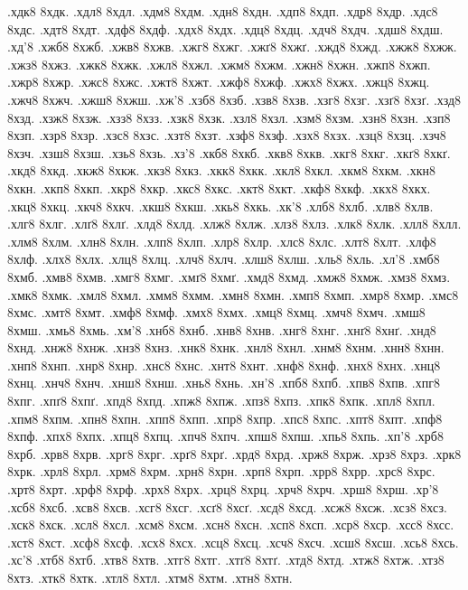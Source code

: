 {.хдк8 8хдк.
.хдл8 8хдл.
.хдм8 8хдм.
.хдн8 8хдн.
.хдп8 8хдп.
.хдр8 8хдр.
.хдс8 8хдс.
.хдт8 8хдт.
.хдф8 8хдф.
.хдх8 8хдх.
.хдц8 8хдц.
.хдч8 8хдч.
.хдш8 8хдш.
.хд'8
.хжб8 8хжб.
.хжв8 8хжв.
.хжг8 8хжг.
.хжґ8 8хжґ.
.хжд8 8хжд.
.хжж8 8хжж.
.хжз8 8хжз.
.хжк8 8хжк.
.хжл8 8хжл.
.хжм8 8хжм.
.хжн8 8хжн.
.хжп8 8хжп.
.хжр8 8хжр.
.хжс8 8хжс.
.хжт8 8хжт.
.хжф8 8хжф.
.хжх8 8хжх.
.хжц8 8хжц.
.хжч8 8хжч.
.хжш8 8хжш.
.хж'8
.хзб8 8хзб.
.хзв8 8хзв.
.хзг8 8хзг.
.хзґ8 8хзґ.
.хзд8 8хзд.
.хзж8 8хзж.
.хзз8 8хзз.
.хзк8 8хзк.
.хзл8 8хзл.
.хзм8 8хзм.
.хзн8 8хзн.
.хзп8 8хзп.
.хзр8 8хзр.
.хзс8 8хзс.
.хзт8 8хзт.
.хзф8 8хзф.
.хзх8 8хзх.
.хзц8 8хзц.
.хзч8 8хзч.
.хзш8 8хзш.
.хзь8 8хзь.
.хз'8
.хкб8 8хкб.
.хкв8 8хкв.
.хкг8 8хкг.
.хкґ8 8хкґ.
.хкд8 8хкд.
.хкж8 8хкж.
.хкз8 8хкз.
.хкк8 8хкк.
.хкл8 8хкл.
.хкм8 8хкм.
.хкн8 8хкн.
.хкп8 8хкп.
.хкр8 8хкр.
.хкс8 8хкс.
.хкт8 8хкт.
.хкф8 8хкф.
.хкх8 8хкх.
.хкц8 8хкц.
.хкч8 8хкч.
.хкш8 8хкш.
.хкь8 8хкь.
.хк'8
.хлб8 8хлб.
.хлв8 8хлв.
.хлг8 8хлг.
.хлґ8 8хлґ.
.хлд8 8хлд.
.хлж8 8хлж.
.хлз8 8хлз.
.хлк8 8хлк.
.хлл8 8хлл.
.хлм8 8хлм.
.хлн8 8хлн.
.хлп8 8хлп.
.хлр8 8хлр.
.хлс8 8хлс.
.хлт8 8хлт.
.хлф8 8хлф.
.хлх8 8хлх.
.хлц8 8хлц.
.хлч8 8хлч.
.хлш8 8хлш.
.хль8 8хль.
.хл'8
.хмб8 8хмб.
.хмв8 8хмв.
.хмг8 8хмг.
.хмґ8 8хмґ.
.хмд8 8хмд.
.хмж8 8хмж.
.хмз8 8хмз.
.хмк8 8хмк.
.хмл8 8хмл.
.хмм8 8хмм.
.хмн8 8хмн.
.хмп8 8хмп.
.хмр8 8хмр.
.хмс8 8хмс.
.хмт8 8хмт.
.хмф8 8хмф.
.хмх8 8хмх.
.хмц8 8хмц.
.хмч8 8хмч.
.хмш8 8хмш.
.хмь8 8хмь.
.хм'8
.хнб8 8хнб.
.хнв8 8хнв.
.хнг8 8хнг.
.хнґ8 8хнґ.
.хнд8 8хнд.
.хнж8 8хнж.
.хнз8 8хнз.
.хнк8 8хнк.
.хнл8 8хнл.
.хнм8 8хнм.
.хнн8 8хнн.
.хнп8 8хнп.
.хнр8 8хнр.
.хнс8 8хнс.
.хнт8 8хнт.
.хнф8 8хнф.
.хнх8 8хнх.
.хнц8 8хнц.
.хнч8 8хнч.
.хнш8 8хнш.
.хнь8 8хнь.
.хн'8
.хпб8 8хпб.
.хпв8 8хпв.
.хпг8 8хпг.
.хпґ8 8хпґ.
.хпд8 8хпд.
.хпж8 8хпж.
.хпз8 8хпз.
.хпк8 8хпк.
.хпл8 8хпл.
.хпм8 8хпм.
.хпн8 8хпн.
.хпп8 8хпп.
.хпр8 8хпр.
.хпс8 8хпс.
.хпт8 8хпт.
.хпф8 8хпф.
.хпх8 8хпх.
.хпц8 8хпц.
.хпч8 8хпч.
.хпш8 8хпш.
.хпь8 8хпь.
.хп'8
.хрб8 8хрб.
.хрв8 8хрв.
.хрг8 8хрг.
.хрґ8 8хрґ.
.хрд8 8хрд.
.хрж8 8хрж.
.хрз8 8хрз.
.хрк8 8хрк.
.хрл8 8хрл.
.хрм8 8хрм.
.хрн8 8хрн.
.хрп8 8хрп.
.хрр8 8хрр.
.хрс8 8хрс.
.хрт8 8хрт.
.хрф8 8хрф.
.хрх8 8хрх.
.хрц8 8хрц.
.хрч8 8хрч.
.хрш8 8хрш.
.хр'8
.хсб8 8хсб.
.хсв8 8хсв.
.хсг8 8хсг.
.хсґ8 8хсґ.
.хсд8 8хсд.
.хсж8 8хсж.
.хсз8 8хсз.
.хск8 8хск.
.хсл8 8хсл.
.хсм8 8хсм.
.хсн8 8хсн.
.хсп8 8хсп.
.хср8 8хср.
.хсс8 8хсс.
.хст8 8хст.
.хсф8 8хсф.
.хсх8 8хсх.
.хсц8 8хсц.
.хсч8 8хсч.
.хсш8 8хсш.
.хсь8 8хсь.
.хс'8
.хтб8 8хтб.
.хтв8 8хтв.
.хтг8 8хтг.
.хтґ8 8хтґ.
.хтд8 8хтд.
.хтж8 8хтж.
.хтз8 8хтз.
.хтк8 8хтк.
.хтл8 8хтл.
.хтм8 8хтм.
.хтн8 8хтн.
}
